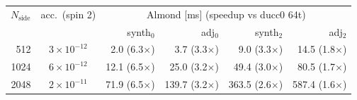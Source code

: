 \begin{tabular}{rcrrrr}
\toprule
$N_\mathrm{side}$ & acc.\ (spin 2) & \multicolumn{4}{c}{Almond [ms] (speedup vs ducc0 64t)} \\
 & & synth$_0$ & adj$_0$ & synth$_2$ & adj$_2$ \\
\midrule
512 & $3\times10^{-12}$ & 2.0 (6.3$\times$) & 3.7 (3.3$\times$) & 9.0 (3.3$\times$) & 14.5 (1.8$\times$) \\
1024 & $6\times10^{-12}$ & 12.1 (6.5$\times$) & 25.0 (3.2$\times$) & 49.4 (3.0$\times$) & 80.5 (1.7$\times$) \\
2048 & $2\times10^{-11}$ & 71.9 (6.5$\times$) & 139.7 (3.2$\times$) & 363.5 (2.6$\times$) & 587.4 (1.6$\times$) \\
\bottomrule
\end{tabular}
